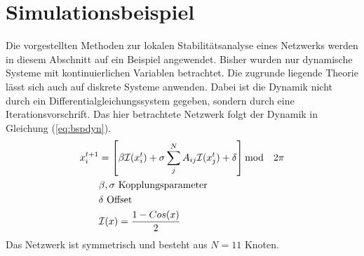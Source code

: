 \section{Simulationsbeispiel}
Die vorgestellten Methoden zur lokalen Stabilitätsanalyse eines Netzwerks werden in diesem Abschnitt auf ein Beispiel angewendet. Bisher wurden nur dynamische Systeme mit kontinuierlichen Variablen betrachtet. Die zugrunde liegende Theorie lässt sich auch auf diskrete Systeme anwenden. Dabei ist die Dynamik nicht durch ein Differentialgleichungssystem gegeben, sondern durch eine Iterationsvorschrift. Das hier betrachtete Netzwerk \cite{pecora2014} folgt der Dynamik in Gleichung (\ref{eq:bspdyn}).
\begin{align}
\label{eq:bspdyn}
	x_i^{t+1}&=\left[\beta\mathcal{I}(x_i^t)+\sigma \sum_j^N A_{ij}\mathcal{I}(x_j^t)+\delta\right] \text{mod}\quad 2\pi
	\\\notag & \beta,\sigma \text{ Kopplungsparameter}
	\\\notag  & \delta \text{ Offset}
	\\\notag &\mathcal{I}(x)=\frac{1-Cos(x)}{2}
\end{align}
Das Netzwerk ist symmetrisch und besteht aus $N=11$ Knoten.
